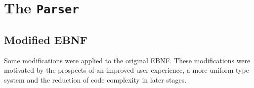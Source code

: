 \section{The \texttt{Parser}}

\subsection{Modified EBNF}

\setlength{\grammarparsep}{8pt plus 1pt minus 1pt} %
\setlength{\grammarindent}{8.5em} %

Some modifications were applied to the original EBNF. These
modifications were motivated by the prospects of an improved
user experience, a more uniform type system and the reduction of
code complexity in later stages.

